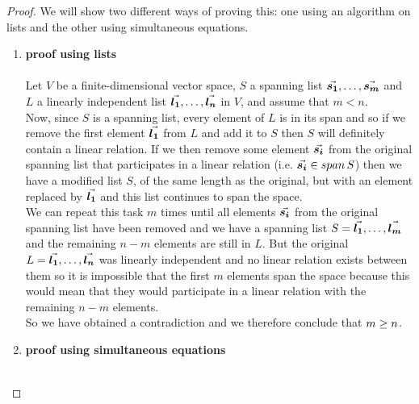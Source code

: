 \documentclass[MathsNotesBase.tex]{subfiles}
\begin{document}
{	\medskip
	\begin{proof}
		We will show two different ways of proving this: one using an algorithm on lists and the other using simultaneous equations.
		\begin{enumerate}[label=(\roman*)]
			\item{\textbf{proof using lists}\\\\
				Let $V$ be a finite-dimensional vector space, $S$ a spanning list ${ \vec{\bm{s_1}}, \dots, \vec{\bm{s_m}} }$ and $L$ a linearly independent list ${ \vec{\bm{l_1}},\dots, \vec{\bm{l_n}} }$ in $V$, and assume that ${ m < n }$.\\
				Now, since $S$ is a spanning list, every element of $L$ is in its span and so if we remove the first element $\vec{\bm{l_1}}$ from $L$ and add it to $S$ then $S$ will definitely contain a linear relation. If we then remove some element $\vec{\bm{s_i}}$ from the original spanning list that participates in a linear relation (i.e. ${ \vec{\bm{s_i}} \in span\,S }$) then we have a modified list $S$, of the same length as the original, but with an element replaced by $\vec{\bm{l_1}}$ and this list continues to span the space.\\
				We can repeat this task $m$ times until all elements $\vec{\bm{s_i}}$ from the original spanning list have been removed and we have a spanning list ${ S = \vec{\bm{l_1}},\dots, \vec{\bm{l_m}} }$ and the remaining ${ n - m }$ elements are still in $L$. But the original ${ L = \vec{\bm{l_1}},\dots, \vec{\bm{l_n}} }$ was linearly independent and no linear relation exists between them so it is impossible that the first $m$ elements span the space because this would mean that they would participate in a linear relation with the remaining ${ n - m }$ elements.\\
				So we have obtained a contradiction and we therefore conclude that ${ m \geq n \qedhere}$.
			}
			\item{\textbf{proof using simultaneous equations}\\\\
}
\end{enumerate}
\end{proof}}
\end{document}
